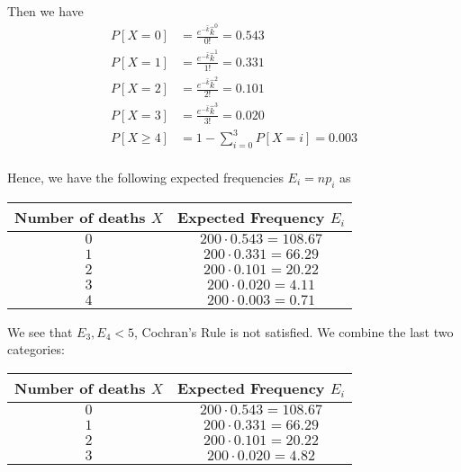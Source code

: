 \documentclass[13pt]{article}
\begin{document}
\par Then we have 
\begin{equation*}
    \begin{split}
        P[X = 0] &= \frac{e^{-\widehat{k}}\widehat{k}^0}{0!} = 0.543\\
        P[X = 1] &= \frac{e^{-\widehat{k}}\widehat{k}^1}{1!} = 0.331\\
        P[X = 2] &= \frac{e^{-\widehat{k}}\widehat{k}^2}{2!} = 0.101\\
        P[X = 3] &= \frac{e^{-\widehat{k}}\widehat{k}^3}{3!} = 0.020\\
        P[X \geq 4] &= 1 - \sum_{i = 0}^3P[X = i] = 0.003\\
    \end{split}
\end{equation*}

\par Hence, we have the following expected frequencies $E_i = np_i$ as 
\begin{table}[H]
    \centering
    \begin{tabular}{cc}
        Number of deaths $X$ & Expected Frequency $E_i$\\
        \toprule
        $0$ & $200\cdot 0.543 = 108.67$ \\
        $1$ & $200\cdot 0.331 = 66.29$ \\
        $2$ & $200\cdot 0.101 = 20.22$ \\
        $3$ & $200\cdot 0.020 = 4.11$ \\
        $4$ & $200\cdot 0.003 = 0.71$ \\
        \bottomrule
    \end{tabular}
\end{table}

\par We see that $E_3, E_4 < 5$, Cochran's Rule is not satisfied. We combine the last two categories:
\begin{table}[H]
    \centering
    \begin{tabular}{cc}
        Number of deaths $X$ & Expected Frequency $E_i$\\
        \toprule
        $0$ & $200\cdot 0.543 = 108.67$ \\
        $1$ & $200\cdot 0.331 = 66.29$ \\
        $2$ & $200\cdot 0.101 = 20.22$ \\
        $3$ & $200\cdot 0.020 = 4.82$ \\
        \bottomrule
    \end{tabular}
\end{table}
\end{document}
